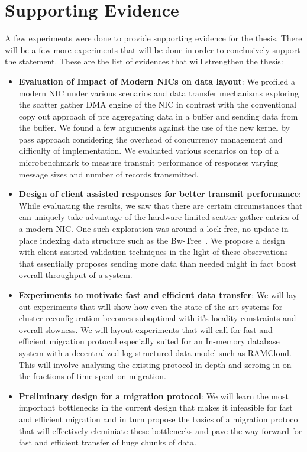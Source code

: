 \section{Supporting Evidence}
A few experiments were done to provide supporting evidence for the thesis. There will be 
a few more experiments that will be done in order to conclusively support the statement. These are the 
list of evidences that will strengthen the thesis:

\begin{itemize}
\item{\textbf{Evaluation of Impact of Modern NICs on data layout}}: We profiled a modern NIC under various 
scenarios and data transfer mechanisms exploring the scatter gather DMA engine of the NIC in contrast
with the conventional copy out approach of pre aggregating data in a buffer and sending data from the buffer.
We found a few arguments against the use of the new kernel by pass approach considering the overhead
of concurrency management and difficulty of implementation. We evaluated various scenarios on top of a
microbenchmark to measure transmit performance of responses varying message sizes and number of records
transmitted.
\item{\textbf{Design of client assisted responses for better transmit performance}}: While evaluating the results,
we saw that there are certain circumstances that can uniquely take advantage of the hardware limited 
scatter gather entries of a modern NIC. One such exploration was around a lock-free, no update in place 
indexing data structure such as the Bw-Tree~\cite{bw-tree}. We propose a design with client assisted 
validation techniques in the light of these observations that essentially proposes sending more data than 
needed might in fact boost overall throughput of a system.
\item{\textbf{Experiments to motivate fast and efficient data transfer}}: We will lay out experiments that will 
show how even the state of the art systems for cluster reconfiguration becomes suboptimal with it's locality
constraints and overall slowness. We will layout experiments that will call for fast and efficient migration protocol
especially suited for an In-memory database system with a decentralized log structured data model such as RAMCloud.
This will involve analysing the existing protocol in depth and zeroing in on the fractions of time spent on migration.
\item{\textbf{Preliminary design for a migration protocol}}: We will learn the most important bottlenecks in the current design
that makes it infeasible for fast and efficient migration and in turn propose the basics of a migration protocol that 
will effectively eleminiate these bottlenecks and pave the way forward for fast and efficient transfer of huge chunks of data.
\end{itemize}

